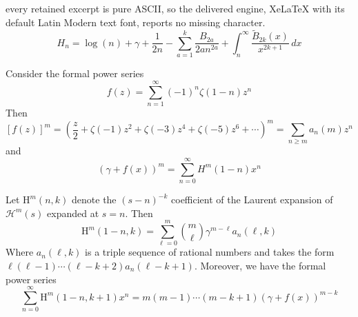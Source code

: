 \documentclass[10pt,a4paper]{amsart}
\newcommand{\pHz}[2]{\mathcal{H}^{#1}(#2)}
\begin{document}
every retained excerpt is pure ASCII, so the delivered engine, XeLaTeX with its default Latin Modern text font, reports no missing character.
\begin{equation}\label{Asymp. Harmonic}H_n=\log(n)+\gamma +\frac{1}{2n}-\sum_{a=1}^k \frac{B_{2a}}{2an^{2a}} +\int_n^{\infty} \frac{\tilde B_{2k}(x)}{x^{2k+1}}\, dx\end{equation}

\begin{lemma}\label{formal power series}
    Consider the formal power series \[f(z)=\sum_{n=1}^{\infty} (-1)^n \zeta(1-n)z^n\]
    Then \begin{equation}\label{generating function of a}
        [f(z)]^m =\left(\frac{z}{2}+\zeta(-1)z^2+\zeta(-3)z^4+\zeta(-5)z^6+\cdots\right)^m=\sum_{n\geq m} a_n(m)z^n
    \end{equation}
and \[(\gamma+ f(x))^m=\sum_{n=0}^{\infty} H^m(1-n) x^n\]
\end{lemma}

\begin{theorem}\label{Laurent expansion of H}
    Let $\mathrm{H}^m(n,k)$ denote the $(s-n)^{-k}$ coefficient of the Laurent expansion of $\pHz{m}{s}$ expanded at $s=n$. Then
    \begin{equation}\label{coefficient of expansion}\mathrm{H}^m(1-n,k)=\sum_{\ell=0}^m \binom{m}{\ell}\gamma^{m-\ell} a_n(\ell,k)\end{equation}
    Where $a_n(\ell, k)$ is a triple sequence of rational numbers and takes the form $\ell(\ell-1)\cdots(\ell -k+2)a_n(\ell-k+1)$. Moreover, we have the formal power series \begin{equation}
        \sum_{n=0}^{\infty}\mathrm{H}^m(1-n,k+1)x^n=m(m-1)\cdots(m-k+1)(\gamma+f(x))^{m-k}
    \end{equation}
\end{theorem}
\end{document}
